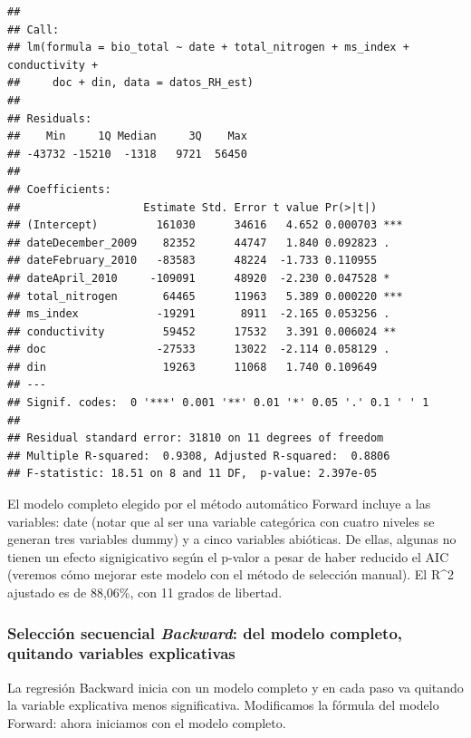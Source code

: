 \documentclass[
]{book}
\begin{document}
\begin{verbatim}
## 
## Call:
## lm(formula = bio_total ~ date + total_nitrogen + ms_index + conductivity + 
##     doc + din, data = datos_RH_est)
## 
## Residuals:
##    Min     1Q Median     3Q    Max 
## -43732 -15210  -1318   9721  56450 
## 
## Coefficients:
##                   Estimate Std. Error t value Pr(>|t|)    
## (Intercept)         161030      34616   4.652 0.000703 ***
## dateDecember_2009    82352      44747   1.840 0.092823 .  
## dateFebruary_2010   -83583      48224  -1.733 0.110955    
## dateApril_2010     -109091      48920  -2.230 0.047528 *  
## total_nitrogen       64465      11963   5.389 0.000220 ***
## ms_index            -19291       8911  -2.165 0.053256 .  
## conductivity         59452      17532   3.391 0.006024 ** 
## doc                 -27533      13022  -2.114 0.058129 .  
## din                  19263      11068   1.740 0.109649    
## ---
## Signif. codes:  0 '***' 0.001 '**' 0.01 '*' 0.05 '.' 0.1 ' ' 1
## 
## Residual standard error: 31810 on 11 degrees of freedom
## Multiple R-squared:  0.9308, Adjusted R-squared:  0.8806 
## F-statistic: 18.51 on 8 and 11 DF,  p-value: 2.397e-05
\end{verbatim}

El modelo completo elegido por el método automático Forward incluye a las variables: date (notar que al ser una variable categórica con cuatro niveles se generan tres variables dummy) y a cinco variables abióticas. De ellas, algunas no tienen un efecto signigicativo según el p-valor a pesar de haber reducido el AIC (veremos cómo mejorar este modelo con el método de selección manual). El R\^{}2 ajustado es de 88,06\%, con 11 grados de libertad.

\hypertarget{selecciuxf3n-secuencial-backward-del-modelo-completo-quitando-variables-explicativas}{%
\subsubsection{\texorpdfstring{Selección secuencial \emph{Backward}: del modelo completo, quitando variables explicativas}{Selección secuencial Backward: del modelo completo, quitando variables explicativas}}\label{selecciuxf3n-secuencial-backward-del-modelo-completo-quitando-variables-explicativas}}

La regresión Backward inicia con un modelo completo y en cada paso va quitando la variable explicativa menos significativa. Modificamos la fórmula del modelo Forward: ahora iniciamos con el modelo completo.
\end{document}
